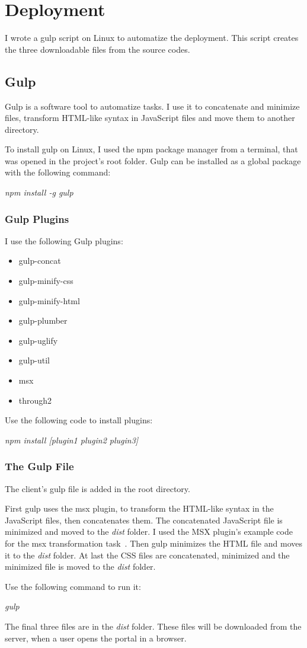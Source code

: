 \chapter{Deployment}
I wrote a gulp script on Linux to automatize the deployment. This script creates the three downloadable files from the source codes.

\section{Gulp}
\label{gulp}

Gulp is a software tool to automatize tasks. I use it to concatenate and minimize files, transform HTML-like syntax in JavaScript files and move them to another directory.

To install gulp on Linux, I used the npm package manager from a terminal, that was opened in the project's root folder. Gulp can be installed as a global package with the following command:

\emph{npm install -g gulp}

\subsection{Gulp Plugins}

I use the following Gulp plugins:

\begin{itemize}
	\item gulp-concat
	\item gulp-minify-css
	\item gulp-minify-html
	\item gulp-plumber		
	\item gulp-uglify
	\item gulp-util
	\item msx
	\item through2
\end{itemize}
	
Use the following code to install plugins:

\emph{npm install [plugin1 plugin2 plugin3]}

\subsection{The Gulp File}
The client's gulp file is added in the root directory. 

First gulp uses the msx plugin, to transform the HTML-like syntax in the JavaScript files, then concatenates them. The concatenated JavaScript file is minimized and moved to the \emph{dist} folder. I used the MSX plugin's example code for the msx transformation task~\cite{gulp-msx-example}. Then gulp minimizes the HTML file and moves it to the \emph{dist} folder. At last the CSS files are concatenated, minimized and the minimized file is moved to the \emph{dist} folder.

Use the following command to run it:

\emph{gulp}

The final three files are in the \emph{dist} folder. These files will be downloaded from the server, when a user opens the portal in a browser.